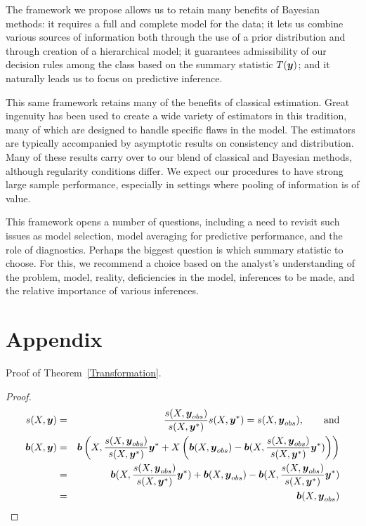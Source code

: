 \documentclass[12pt]{article}
\newcommand{\by}{\mbox{\boldmath $y$}}
\newcommand{\bb}{\mbox{\boldmath $b$}}
\begin{document}
The framework we propose allows us to retain many benefits of Bayesian methods:  it requires a full and complete model for the data; it lets us combine various sources of information both through the use of a prior distribution and through creation of a hierarchical model; it guarantees admissibility of our decision rules among the class based on the summary statistic $T(\by)$; and it naturally leads us to focus on predictive inference.   

This same framework retains many of the benefits of classical estimation.  Great ingenuity has been used to create a wide variety of estimators in this tradition, many of which are designed to handle specific flaws in the model.  The estimators are typically accompanied by asymptotic results on consistency and distribution.  Many of these results carry over to our blend of classical and Bayesian methods, although regularity conditions differ.  We expect our procedures to have strong large sample performance, especially in settings where
pooling of information is of value.  

This framework opens a number of questions, including a need to revisit such issues as model selection, model averaging for predictive performance, and the role of diagnostics.  Perhaps the biggest question is which summary statistic to choose.  For this, we recommend a choice based on the analyst's understanding of the problem, model, reality, deficiencies in the model,  inferences to be made, and the relative importance of various inferences. 


\section{Appendix}
\label{sec:appendix}

\noindent
Proof of Theorem~\ref{Transformation}.  
\begin{proof} 
\begin{eqnarray}
 s(X,\by) & = & \frac{s(X,\by_{obs})}{s(X,\by^*)} s(X, \by^*)= s(X,\by_{obs}) , \qquad \mbox{and} \\
 \bb(X,\by) & = & \bb\left(X,\frac{s(X,\by_{obs})}{s(X,\by^*)}\by^* + X\left(\bb(X,\by_{obs}) - \bb(X,\frac{s(X,\by_{obs})}{s(X,\by^*)}\by^*)\right)\right) \\
 & = & \bb(X,\frac{s(X,\by_{obs})}{s(X,\by^*)}\by^*) + \bb(X,\by_{obs}) - \bb(X,\frac{s(X,\by_{obs})}{s(X,\by^*)}\by^*) \\ &=& \bb(X,\by_{obs})
\end{eqnarray}
\end{proof}
\end{document}
